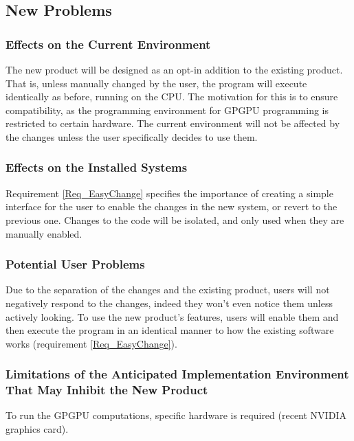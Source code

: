 \documentclass[12pt]{article}
\begin{document}
\subsection{New Problems} %
\subsubsection{Effects on the Current Environment}
The new product will be designed as an opt-in addition to the existing product. That is, unless manually changed by the user, the program will execute identically as before, running on the CPU. The motivation for this is to ensure compatibility, as the programming environment for GPGPU programming is restricted to certain hardware. The current environment will not be affected by the changes unless the user specifically decides to use them.

\subsubsection{Effects on the Installed Systems}
Requirement \ref{Req_EasyChange} specifies the importance of creating a simple interface for the user to enable the changes in the new system, or revert to the previous one. Changes to the code will be isolated, and only used when they are manually enabled.

\subsubsection{Potential User Problems}
Due to the separation of the changes and the existing product, users will not negatively respond to the changes, indeed they won't even notice them unless actively looking. To use the new product's features, users will enable them and then execute the program in an identical manner to how the existing software works (requirement \ref{Req_EasyChange}).

\subsubsection{Limitations of the Anticipated Implementation Environment That May Inhibit the New Product}
To run the GPGPU computations, specific hardware is required (recent NVIDIA graphics card).
\end{document}
